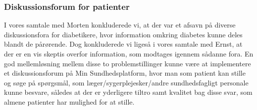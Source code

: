 \subsubsection{Diskussionsforum for patienter}
I vores samtale med Morten konkluderede vi, at der var et afsavn på diverse diskussionsfora for diabetikere, hvor information omkring diabetes kunne deles blandt de pårørende.
Dog konkluderede vi ligeså i vores samtale med Ernst, at der er en vis skeptis overfor information, som modtages igennem sådanne fora. En god mellemløsning mellem disse to problemstillinger kunne være at implementere et diskussionsforum på Min Sundhedsplatform, hvor man som patient kan stille og søge på spørgsmål, som læger/sygerplejesker/andre sundhedsfagligt personale kunne besvare, således at der er yderligere tiltro samt kvalitet bag disse svar, som almene patienter har mulighed for at stille. 
